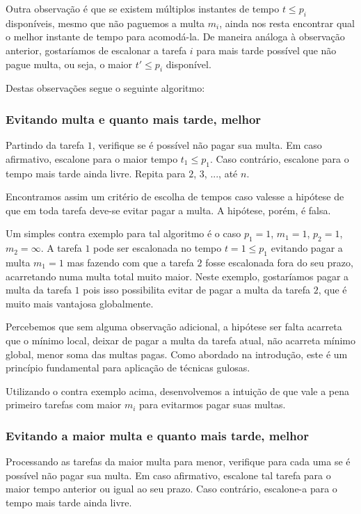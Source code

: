 Outra observação é que se existem múltiplos instantes de tempo $t \leq p_i$ disponíveis, mesmo que não paguemos a multa $m_i$, ainda nos resta encontrar qual o melhor instante de tempo para acomodá-la. De maneira análoga à observação anterior, gostaríamos de escalonar a tarefa $i$ para mais tarde possível que não pague multa, ou seja, o maior $t' \leq p_i$ disponível.

Destas observações segue o seguinte algoritmo:

\subsubsection*{Evitando multa e quanto mais tarde, melhor}

Partindo da tarefa $1$, verifique se é possível não pagar sua multa. Em caso afirmativo, escalone para o maior tempo $t_1 \leq p_1$. Caso contrário, escalone para o tempo mais tarde ainda livre. Repita para $2$, $3$, ..., até $n$.

Encontramos assim um critério de escolha de tempos caso valesse a hipótese de que em toda tarefa deve-se evitar pagar a multa. A hipótese, porém, é falsa.

Um simples contra exemplo para tal algoritmo é o caso $p_1 = 1$, $m_1 = 1$, $p_2 = 1$, $m_2 = \infty$. A tarefa $1$ pode ser escalonada no tempo $t = 1 \leq p_1$ evitando pagar a multa $m_1 = 1$ mas fazendo com que a tarefa $2$ fosse escalonada fora do seu prazo, acarretando numa multa total muito maior. Neste exemplo, gostaríamos pagar a multa da tarefa $1$ pois isso possibilita evitar de pagar a multa da tarefa $2$, que é muito mais vantajosa globalmente.

Percebemos que sem alguma observação adicional, a hipótese ser falta acarreta que o mínimo local, deixar de pagar a multa da tarefa atual, não acarreta mínimo global, menor soma das multas pagas. Como abordado na introdução, este é um princípio fundamental para aplicação de técnicas gulosas.

Utilizando o contra exemplo acima, desenvolvemos a intuição de que vale a pena  primeiro tarefas com maior $m_i$ para evitarmos pagar suas multas.

\subsubsection*{Evitando a maior multa e quanto mais tarde, melhor}

Processando as tarefas da maior multa para menor, verifique para cada uma se é possível não pagar sua multa. Em caso afirmativo, escalone tal tarefa para o maior tempo anterior ou igual ao seu prazo. Caso contrário, escalone-a para o tempo mais tarde ainda livre.

